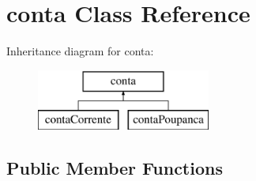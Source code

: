 \hypertarget{classconta}{}\section{conta Class Reference}
\label{classconta}
Inheritance diagram for conta\+:\begin{figure}[H]
\begin{center}
\leavevmode
\includegraphics[height=2.000000cm]{classconta}
\end{center}
\end{figure}
\subsection*{Public Member Functions}
